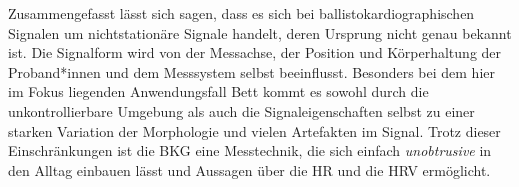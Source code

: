 	
	Zusammengefasst lässt sich sagen, dass es sich bei ballistokardiographischen Signalen um nichtstationäre Signale handelt, deren Ursprung nicht genau bekannt ist. Die Signalform wird von der Messachse, der Position und Körperhaltung der Proband*innen und dem Messsystem selbst beeinflusst. Besonders bei dem hier im Fokus liegenden Anwendungsfall Bett kommt es sowohl durch die unkontrollierbare Umgebung als auch die Signaleigenschaften selbst zu einer starken Variation der Morphologie und vielen Artefakten im Signal. Trotz dieser Einschränkungen ist die \acl{BKG} eine Messtechnik, die sich einfach \textit{unobtrusive} in den Alltag einbauen lässt und Aussagen über die \acl{HR} und die \acl{HRV} ermöglicht.

